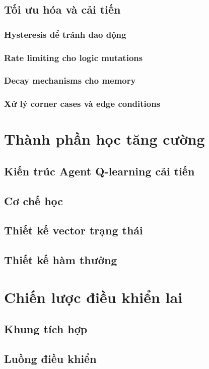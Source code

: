 \documentclass[12pt,a4paper,oneside]{report}
\begin{document}
\section{Tối ưu hóa và cải tiến}
\subsection{Hysteresis để tránh dao động}
\subsection{Rate limiting cho logic mutations}
\subsection{Decay mechanisms cho memory}
\subsection{Xử lý corner cases và edge conditions}
\chapter{Thành phần học tăng cường}
\section{Kiến trúc Agent Q-learning cải tiến}
\section{Cơ chế học}
\section{Thiết kế vector trạng thái}
\section{Thiết kế hàm thưởng}

\chapter{Chiến lược điều khiển lai}
\section{Khung tích hợp}
\section{Luồng điều khiển}
\end{document}
